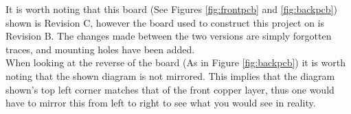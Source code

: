 \documentclass[12pt,a4paper]{report}
\begin{document}
It is worth noting that this board (See Figures \ref{fig:frontpcb} and \ref{fig:backpcb}) shown is Revision C, however the board used to construct this project on is Revision B. The changes made between the two versions are simply forgotten traces, and mounting holes have been added.\\
When looking at the reverse of the board (As in Figure \ref{fig:backpcb}) it is worth noting that the shown diagram is not mirrored. This implies that the diagram shown's top left corner matches that of the front copper layer, thus one would have to mirror this from left to right to see what you would see in reality.

\newpage
\end{document}
